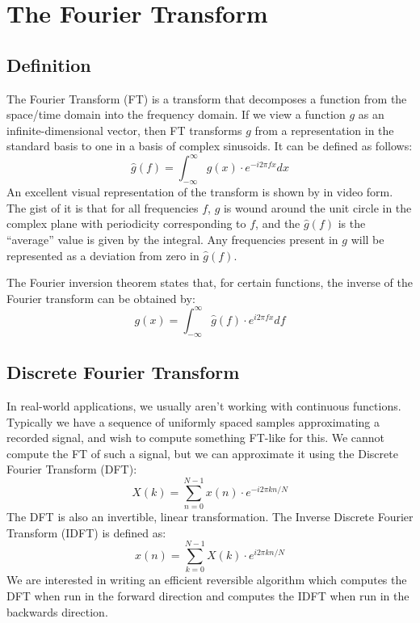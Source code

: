 \section{The Fourier Transform\label{sec:fourier}}
\subsection{Definition}
The Fourier Transform (FT) is a transform
that decomposes a function from the space/time domain into the frequency domain. %
If we view a function $g$ as an infinite-dimensional vector,
then FT transforms $g$ from a representation in the standard basis
to one in a basis of complex sinusoids.
It can be defined as follows:
%
\begin{equation}
     \hat g(f) = \int_{-\infty}^{\infty} g(x) \cdot e^{-i 2 \pi f x} dx
\end{equation}
%
An excellent visual representation of the transform is shown by \cite{3blue} in video form.
The gist of it is that for all frequencies $f$,
$g$ is wound around the unit circle in the complex plane with periodicity corresponding to $f$,
and the $\hat g(f)$ is the ``average'' value is given by the integral.
Any frequencies present in $g$ will be represented as a deviation from zero in $\hat g(f)$.
%

The Fourier inversion theorem states that,
for certain functions,
the inverse of the Fourier transform can be obtained by:
\begin{equation}
     g(x) = \int_{-\infty}^{\infty} \hat g(f) \cdot e^{i 2 \pi f x} df
\end{equation}

\subsection{Discrete Fourier Transform}
In real-world applications, we usually aren't working with continuous functions.
Typically we have a sequence of uniformly spaced samples approximating a recorded signal,
and wish to compute something FT-like for this.
We cannot compute the FT of such a signal,
but we can approximate it using the Discrete Fourier Transform (DFT):
%
\begin{equation}
    X(k) = \sum_{n = 0}^{N - 1} x(n) \cdot e^{-i 2 \pi kn / N}
\end{equation}
%
The DFT is also an invertible, linear transformation.
The Inverse Discrete Fourier Transform (IDFT) is defined as:
\begin{equation}
    x(n) = \sum_{k = 0}^{N - 1} X(k) \cdot e^{i 2 \pi kn / N}
\end{equation}
%
We are interested in writing an efficient reversible algorithm
which computes the DFT when run in the forward direction
and computes the IDFT when run in the backwards direction.
